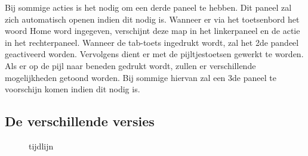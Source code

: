 \documentclass[12pt]{article} %
\begin{document}
\vspace{5 mm}
\setlength{\parindent}{0pt}Bij sommige acties is het nodig om een derde paneel te hebben. Dit paneel zal zich automatisch openen indien dit nodig is. Wanneer er via het toetsenbord het woord Home word ingegeven, verschijnt deze map in het linkerpaneel en de actie in het rechterpaneel. Wanneer de tab-toets ingedrukt wordt, zal het 2de pandeel geactiveerd worden. Vervolgens dient er met de pijltjestoetsen gewerkt te worden. Als er op de pijl naar beneden gedrukt wordt, zullen er verschillende mogelijkheden getoond worden. Bij sommige hiervan zal een 3de paneel te voorschijn komen indien dit nodig is. \cite{Gnome}



\newpage %



\subsection{De verschillende versies} %

\begin{figure}[H]
\caption{tijdlijn}
\label{tijdlijn}
\end{figure}
\end{document}
